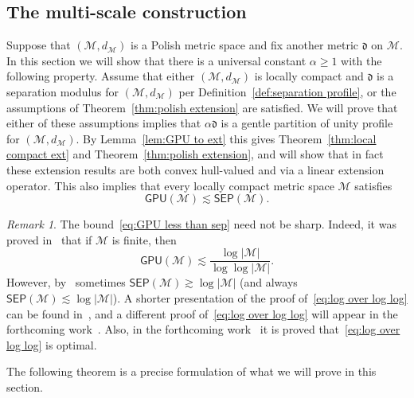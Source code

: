 \documentclass[11pt,reqno]{amsart}
\renewcommand{\ge}{\geqslant}
\theoremstyle{remark}
\newtheorem{remark}[theorem]{Remark}
\newcommand{\MM}{\mathcal{M}}
\renewcommand{\1}{\mathbf 1}
\newcommand{\sep}{\mathsf{SEP}}
\newcommand{\gpu}{\mathsf{GPU}}
\begin{document}
\subsection{The multi-scale construction} Suppose that $(\MM,d_\MM)$ is a Polish metric space and fix another metric $\mathfrak{d}$ on $\MM$. In this section we will show that there is a universal constant $\alpha\ge 1$ with the following property. Assume that either $(\MM,d_\MM)$ is locally compact and $\mathfrak{d}$ is a separation modulus for $(\MM,d_\MM)$ per Definition~\ref{def:separation profile}, or the assumptions of Theorem~\ref{thm:polish extension}  are satisfied. We will prove that either of these assumptions implies that $\alpha\mathfrak{d}$ is a gentle partition of unity profile  for $(\MM,d_\MM)$. By Lemma~\ref{lem:GPU to ext} this gives Theorem~\ref{thm:local compact ext} and  Theorem~\ref{thm:polish extension}, and will show that in fact these extension results are both  convex hull-valued and via a linear extension operator. This also implies that every locally compact metric space $\MM$ satisfies
\begin{equation}\label{eq:GPU less than sep}
\gpu(\MM)\lesssim\sep(\MM).
\end{equation}
\begin{remark}
The bound~\eqref{eq:GPU less than sep} need not be sharp. Indeed, it was proved in~\cite{LN05} that if $\MM$ is finite, then
\begin{equation}\label{eq:log over log log}
\gpu(\MM)\lesssim \frac{\log |\MM|}{\log\log |\MM|}.
\end{equation}
However, by~\cite{Bar96} sometimes $\sep(\MM)\gtrsim \log |\MM|$ (and always $\sep(\MM)\lesssim \log |\MM|$). A shorter presentation of the proof of~\eqref{eq:log over log log} can be found in~\cite{Nao15-class}, and a different proof of~\eqref{eq:log over log log} will appear in the forthcoming work~\cite{MN21}. Also, in the forthcoming work~\cite{MNR21}    it is proved that~\eqref{eq:log over log log} is optimal.
\end{remark}

The following theorem is a precise formulation of what we will prove in this section.
\end{document}
